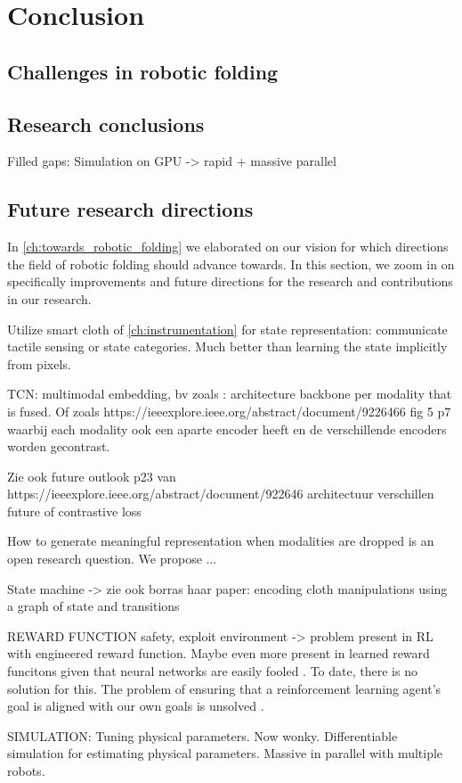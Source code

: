 \documentclass[\home/main.tex]{subfiles}
\begin{document}
\chapter{Conclusion}\label{ch:conclusion}


\section{Challenges in robotic folding}

\section{Research conclusions}
Filled gaps:
    Simulation on GPU -> rapid + massive parallel 


\section{Future research directions} \label{sec:conc_future_work}
In \cref{ch:towards_robotic_folding} we elaborated on our vision for which directions the field of robotic folding should advance towards. In this section, we zoom in on specifically improvements and future directions for the research and contributions in our research. 

Utilize smart cloth of \cref{ch:instrumentation} for state representation: communicate tactile sensing or state categories. Much better than learning the state implicitly from pixels. 


TCN:
    multimodal embedding, bv zoals \autocite{making sense of vision and touch}: architecture backbone per modality that is fused. Of zoals https://ieeexplore.ieee.org/abstract/document/9226466 fig 5 p7 waarbij each modality ook een aparte encoder heeft en de verschillende encoders worden gecontrast. 

    Zie ook future outlook p23 van https://ieeexplore.ieee.org/abstract/document/922646
        architectuur verschillen
        future of contrastive loss

    How to generate meaningful representation when modalities are dropped is an open research question. We propose ... 

    State machine -> zie ook borras haar paper: encoding cloth manipulations using a graph of state and transitions 


REWARD FUNCTION 
    safety, exploit environment -> problem present in RL with engineered reward function. Maybe even more present in learned reward funcitons given that neural networks are easily fooled \autocite{nn are easily fooled, adversarial examples}. To date, there is no solution for this. The problem of ensuring that a reinforcement learning agent’s goal is aligned with our own goals is unsolved \autocite{Sutton2018}. 

SIMULATION:
    Tuning physical parameters. Now wonky. Differentiable simulation for estimating physical parameters.
    Massive in parallel with multiple robots. 
\end{document}
